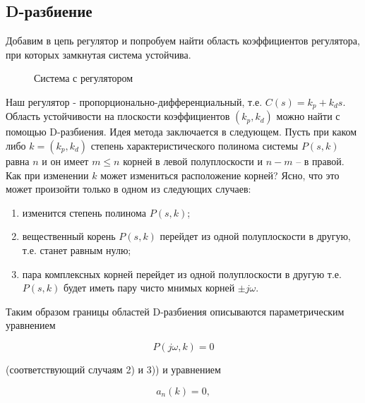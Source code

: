 \documentclass[12pt,a4paper]{article}
\begin{document}
\subsection{D-разбиение}

Добавим в цепь регулятор и попробуем найти область коэффициентов регулятора, при которых замкнутая система устойчива.

\begin{figure}
	\caption{Система с регулятором}
\end{figure}

Наш регулятор - пропорционально-дифференциальный, т.е. $C(s) = k_p + k_d s$. Область устойчивости на плоскости коэффициентов $(k_p, k_d)$ можно найти с помощью D-разбиения. Идея метода заключается в следующем. Пусть при каком либо $k = (k_p, k_d)$ степень характеристического полинома системы $P(s,k)$равна $n$ и он имеет $m \le n$ корней в левой полуплоскости и $n - m$ -- в правой. Как при изменении $k$ может измениться расположение корней? Ясно, что это может произойти только в одном из следующих случаев:

\begin{enumerate}
	\item изменится степень полинома $P(s,k)$;
	\item вещественный корень $P(s,k)$ перейдет из одной полуплоскости в другую, т.е. станет равным нулю;
	\item пара комплексных корней перейдет из одной полуплоскости в другую т.е. $P(s,k)$ будет иметь пару чисто мнимых корней $\pm j\omega$.
\end{enumerate}

Таким образом границы областей D-разбиения описываются параметрическим уравнением 

\begin{equation}
	\label{eq:d_part_eq_1}
	P(j\omega, k) = 0
\end{equation}

(соответствующий случаям 2) и 3)) и уравнением 

\begin{equation}
	\label{eq:d_part_eq_2}
	a_n(k) = 0,
\end{equation}	
\end{document}
